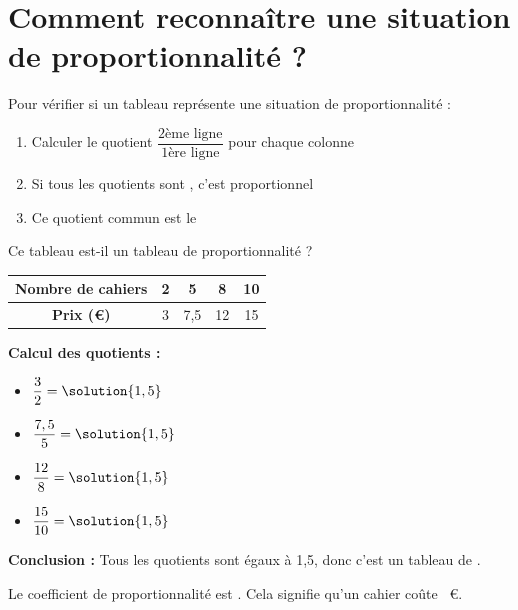 \clearpage
\seance

\section{Comment reconnaître une situation de proportionnalité ?}

\begin{methodebox}
	Pour vérifier si un tableau représente une situation de proportionnalité :
	\begin{enumerate}
		\item Calculer le quotient $\dfrac{\text{2ème ligne}}{\text{1ère ligne}}$ pour chaque colonne
		\item Si tous les quotients sont , c'est proportionnel
		\item Ce quotient commun est le 
	\end{enumerate}
\end{methodebox}

\begin{examplebox}
	Ce tableau est-il un tableau de proportionnalité ?

	\begin{center}
		\renewcommand{\arraystretch}{1.5}
		\begin{tabular}{|c|c|c|c|c|}
			\hline
			\textbf{Nombre de cahiers} & 2 & 5 & 8 & 10 \\
			\hline
			\textbf{Prix (€)} & 3 & 7,5 & 12 & 15 \\
			\hline
		\end{tabular}
	\end{center}

	\textbf{Calcul des quotients :}
	\begin{itemize}
		\item $\dfrac{3}{2} = \solution{1,5}$
		\item $\dfrac{7,5}{5} = \solution{1,5}$
		\item $\dfrac{12}{8} = \solution{1,5}$
		\item $\dfrac{15}{10} = \solution{1,5}$
	\end{itemize}

	\textbf{Conclusion :} Tous les quotients sont égaux à 1,5, donc c'est un tableau de .

	Le coefficient de proportionnalité est . Cela signifie qu'un cahier coûte ~€.
\end{examplebox}

